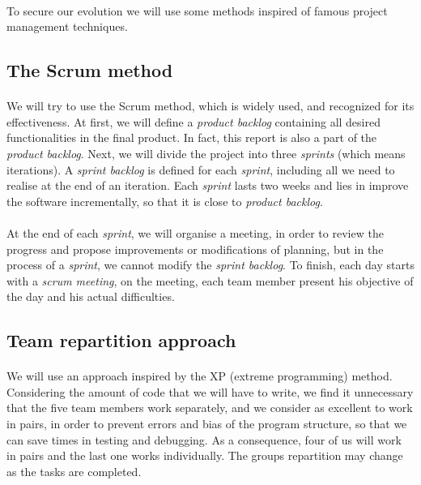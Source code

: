 \documentclass{report}
\begin{document}
\paragraph{}
\hspace{4mm}To secure our evolution we will use some methods inspired of famous project management techniques.

\subsection{The Scrum method}

\paragraph{}
\hspace{4mm}We will try to use the Scrum method, which is widely used, and recognized for its effectiveness. At first, we will define a \textit{product backlog} containing all desired functionalities in the final product. In fact, this report is also a part of the \textit{product backlog}. 
Next, we will divide the project into three \textit{sprints} (which means iterations). A \textit{sprint backlog} is defined for each \textit{sprint}, including all we need to realise at the end of an iteration. Each \textit{sprint} lasts two weeks and lies in improve the software 
incrementally, so that it is close to \textit{product backlog}.

\paragraph{}
\hspace{4mm}At the end of each \textit{sprint}, we will organise a meeting, in order to review the progress and propose improvements or modifications of planning,
 but in the process of a \textit{sprint}, we cannot modify the \textit{sprint backlog}. 
To finish, each day starts with a \textit{scrum meeting}, on the meeting, each 
team member present his objective of the day and his actual difficulties.

\subsection{Team repartition approach}

\paragraph{}
\hspace{4mm}We will use an approach inspired by the XP (extreme programming) method. 
Considering the amount of code that we will have to write, we find it unnecessary that the five team members work separately, 
and we consider as excellent to work in pairs, in order to prevent errors and bias 
of the program structure, so that we can save times in testing and debugging. 
As a consequence, four of us will work in pairs and the last one works individually. The groups repartition
may change as the tasks are completed.
\end{document}
